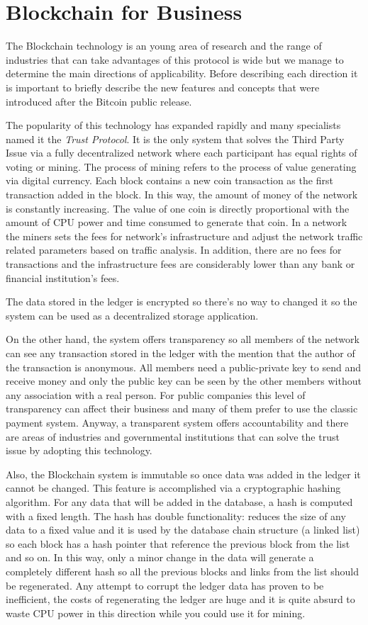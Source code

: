 \section{Blockchain for Business}
\label{sec:chapter1-sec2}
The Blockchain technology is an young area of research and the range of industries that can take advantages of this protocol is wide but we manage to determine the main directions of applicability. Before describing each direction it is important to briefly describe the new features and concepts that were introduced after the Bitcoin public release.

The popularity of this technology has expanded rapidly and many specialists named it the \emph{Trust Protocol}. It is the only system that solves the Third Party Issue via a fully decentralized network where each participant has equal rights of voting or mining. The process of mining refers to the process of value generating via digital currency. Each block contains a new coin transaction as the first transaction added in the block. In this way, the amount of money of the network is constantly increasing. The value of one coin is directly proportional with the amount of CPU power and time consumed to generate that coin.
In a network the miners sets the fees for network's infrastructure and adjust the network traffic related parameters based on traffic analysis. In addition, there are no fees for transactions and the infrastructure fees are considerably lower than any bank or financial institution's fees.

The data stored in the ledger is encrypted so there's no way to changed it so the system can be used as a decentralized storage application.

On the other hand, the system offers transparency so all members of the network can see any transaction stored in the ledger with the mention that the author of the transaction is anonymous. All members need a public-private key to send and receive money and only the public key can be seen by the other members without any association with a real person. For public companies this level of transparency can affect their business and many of them prefer to use the classic payment system. Anyway, a transparent system offers accountability and there are areas of industries and governmental institutions that can solve the trust issue by adopting this technology. 

Also, the Blockchain system is immutable so once data was added in the ledger it cannot be changed. This feature is accomplished via a cryptographic hashing algorithm. For any data that will be added in the database, a hash is computed with a fixed length. The hash has double functionality: reduces the size of any data to a fixed value and it is used by the database chain structure (a linked list) so each block has a hash pointer that reference the previous block from the list and so on. In this way, only a minor change in the data will generate a completely different hash so all the previous blocks and links from the list should be regenerated. Any attempt to corrupt the ledger data has proven to be inefficient, the costs of regenerating the ledger are huge and it is quite absurd to waste CPU power in this direction while you could use it for mining.

